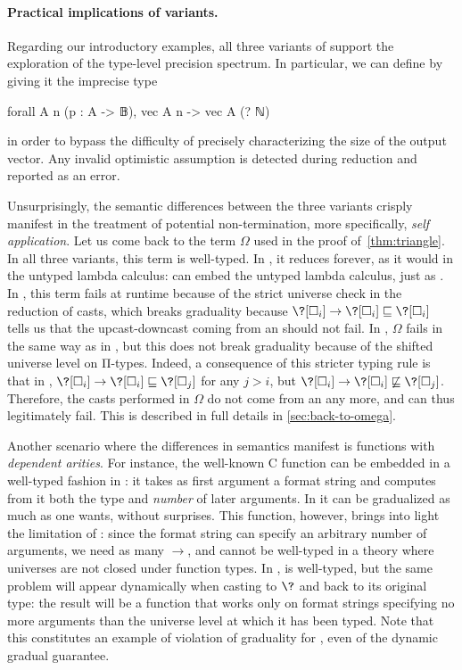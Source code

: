 \paragraph{Practical implications of  variants.}
Regarding our introductory examples, all three variants of 
support the exploration of the type-level precision spectrum.
In particular, we can define  by giving it the imprecise type
\begin{coqcode}
  forall A n (p : A -> 𝔹), vec A n -> vec A (? ℕ)
\end{coqcode}
in order to bypass the difficulty of precisely characterizing the size of the output vector.
Any invalid optimistic assumption is detected during reduction and reported as an error.

Unsurprisingly, the semantic differences between the three  variants crisply manifest in the treatment of potential non-termination, more specifically, \emph{self application}.
%
Let us come back to the term $\Omega$
used in the proof of~\cref{thm:triangle}.
In all three variants, this term is well-typed. In , it
reduces forever, as it would in the untyped lambda calculus:
 can embed the untyped lambda calculus, just as
 . In , this term fails at runtime
because of the strict universe check in the reduction of casts, which
breaks graduality because $\?[\uni[i]] \to \?[\uni[i]] \pre \?[\uni[i]]$
tells us that the upcast-downcast coming from an  should not fail.
%
In , $\Omega$ fails in the same way as in , but this
does not break graduality because of the shifted universe level on Π-types.
%
Indeed, a consequence of this stricter typing rule is that in ,
$\?[\uni[i]] \to \?[\uni[i]] \pre \?[\uni[j]]$
for any $j > i$, but $\?[\uni[i]] \to \?[\uni[i]] \npre \?[\uni[j]]$.
Therefore, the casts performed in $\Omega$ do not come from an 
any more, and can thus legitimately fail.
%
This is described in full details in \cref{sec:back-to-omega}.

Another scenario where the differences in semantics manifest is functions with
\emph{dependent arities}.
For instance, the well-known C function \printf{} can be embedded in a well-typed fashion in
: it takes as first argument a format string and computes from it both
the type and \emph{number} of later arguments.
In  it can be gradualized as much as one wants, without surprises.
%
This function, however, brings into light the limitation of :
since the format string can specify an arbitrary number of arguments,
we need as many $\to$, and \printf{} cannot be well-typed
in a theory where universes are not closed under function types.
%
In , \printf{} is well-typed, but the same problem will appear dynamically
when casting \printf{} to $\?$ and back to its original type: the result will be
a function that works only on format strings specifying no more arguments than
the universe level at which it has been typed.
%
Note that this constitutes an example of violation of graduality for
, even of the dynamic gradual guarantee.

